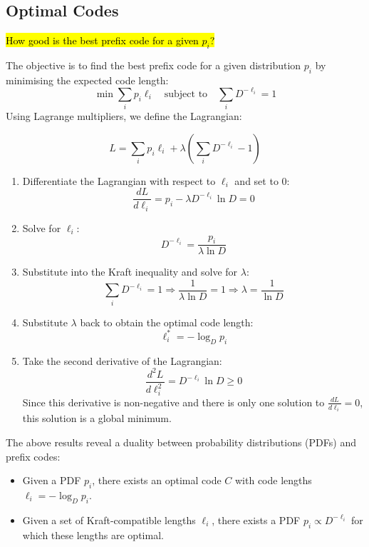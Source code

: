 \subsection{Optimal Codes}

\hl{How good is the best prefix code for a given $p_i$?}

The objective is to find the best prefix code for a given distribution \( p_i \) by minimising the expected code length:
\[
    \min \sum_i p_i \ell_i \quad \text{subject to} \quad \sum_i D^{-\ell_i} = 1
\]
Using Lagrange multipliers, we define the Lagrangian: 

\[
    L = \sum_i p_i \ell_i + \lambda \left( \sum_i D^{-\ell_i} - 1 \right)
\]

\begin{enumerate}
    \item Differentiate the Lagrangian with respect to \(\ell_i\) and set to 0:
          \[
              \frac{dL}{d\ell_i} = p_i - \lambda D^{-\ell_i} \ln D = 0
          \]
    \item Solve for \(\ell_i\):
          \[
              D^{-\ell_i} = \frac{p_i}{\lambda \ln D}
          \]
    \item Substitute into the Kraft inequality and solve for \(\lambda\):
          \[
              \sum_i D^{-\ell_i} = 1 \Rightarrow \frac{1}{\lambda \ln D} = 1 \Rightarrow \lambda = \frac{1}{\ln D}
          \]
    \item Substitute \(\lambda\) back to obtain the optimal code length:
          \[
              \ell_i^* = -\log_D p_i
          \]
    \item Take the second derivative of the Lagrangian:
          \[
              \frac{d^2L}{d\ell_i^2} = D^{-\ell_i} \ln D \geq 0
          \]
          Since this derivative is non-negative and there is only one solution to \( \frac{dL}{d\ell_i} = 0 \), this solution is a global minimum.
\end{enumerate}



The above results reveal a duality between probability distributions (PDFs) and prefix codes:
\begin{itemize}
    \item Given a PDF \( p_i \), there exists an optimal code \( C \) with code lengths \( \ell_i = -\log_D p_i \).
    \item Given a set of Kraft-compatible lengths \( \ell_i \), there exists a PDF \( p_i \propto D^{-\ell_i} \) for which these lengths are optimal.
\end{itemize}

